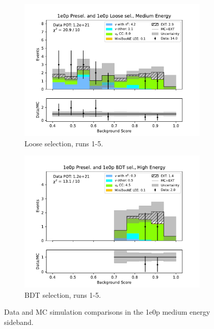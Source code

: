 \begin{figure}[H]
\begin{subfigure}{0.33\linewidth}
        \includegraphics[width=\linewidth]{technote/Sidebands/Figures/NearSideband/near_sideband_bkg_score_run1234a4b4c4d5_ZP_ZPLOOSESEL_MEDIUM_ENERGY.pdf}
        \caption{Loose selection, runs 1-5.}
    \end{subfigure}%
    \begin{subfigure}{0.33\linewidth}
        \includegraphics[width=\linewidth]{technote/Sidebands/Figures/NearSideband/near_sideband_bkg_score_run1234a4b4c4d5_ZP_ZPBDT_MEDIUM_ENERGY.pdf}
        \caption{BDT selection, runs 1-5.}
    \end{subfigure}
    \caption{Data and MC simulation comparisons in the 1e0p medium energy sideband.}
\end{figure}


